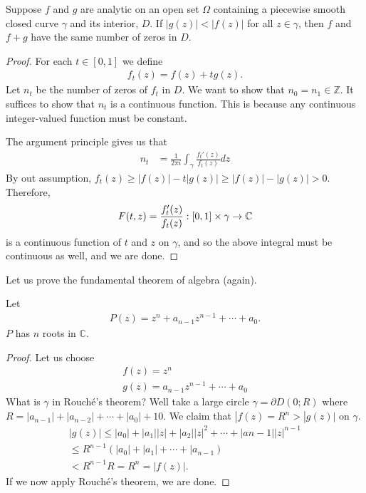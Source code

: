 \begin{thm}
    Suppose $f$ and $g$ are analytic on an open set $\Omega$ containing a piecewise smooth closed curve $\gamma$ and its interior, $D$.
    If $|g(z)|<|f(z)|$ for all $z\in\gamma$, then $f$ and $f+g$ have the same number of zeros in $D$.
\end{thm}

\begin{proof}
    For each $t\in[0,1]$ we define
    \begin{align*}
        f_t(z)=f(z)+tg(z).
    \end{align*}
    Let $n_t$ be the number of zeros of $f_t$ in $D$. We want to show that $n_0=n_1\in\mathbb{Z}$. It suffices to show that $n_t$ is a
    continuous function. This is because any continuous integer-valued function must be constant.

    The argument principle gives us that 
    \begin{align*}
        n_t&=\frac{1}{2\pi i}\int_\gamma\frac{f_t'(z)}{f_t(z)} dz
    \end{align*}
    By out assumption, $f_t(z)\geq|f(z)|-t|g(z)|\geq|f(z)|-|g(z)|>0$. Therefore,
    \begin{align*}
        F(t,z)=\frac{f_t'(z)}{f_t(z)}:[0,1]\times\gamma\rightarrow \mathbb{C}
    \end{align*}
    is a continuous function of $t$ and $z$ on $\gamma$, and so the above integral must be continuous as well, and we are done.
\end{proof}

Let us prove the fundamental theorem of algebra (again).
\begin{thm}
    Let
    \begin{align*}
        P(z)=z^n+a_{n-1}z^{n-1}+\cdots+a_0.
    \end{align*}
    $P$ has $n$ roots in $\mathbb{C}$.
\end{thm}
\begin{proof}
    Let us choose
    \begin{align*}
        f(z)=z^n\\
        g(z)=a_{n-1}z^{n-1}+\cdots+a_0
    \end{align*}
    What is $\gamma$ in Rouch\'{e}'s theorem? Well take a large circle $\gamma=\partial D(0;R)$ where $R=|a_{n-1}|+|a_{n-2}|+\cdots+|a_0| + 10$.
    We claim that $|f(z)=R^n>|g(z)|$ on $\gamma$.
    \begin{align*}
        |g(z)|\leq |a_0|+|a_1||z|+|a_2||z|^2+\cdots+|a{n-1}||z|^{n-1}\\
        \leq R^{n-1}(|a_0|+|a_1|+\cdots+|a_{n-1})\\
        < R^{n-1} R=R^n=|f(z)|.
    \end{align*}
    If we now apply Rouch\'{e}'s theorem, we are done.
\end{proof}


